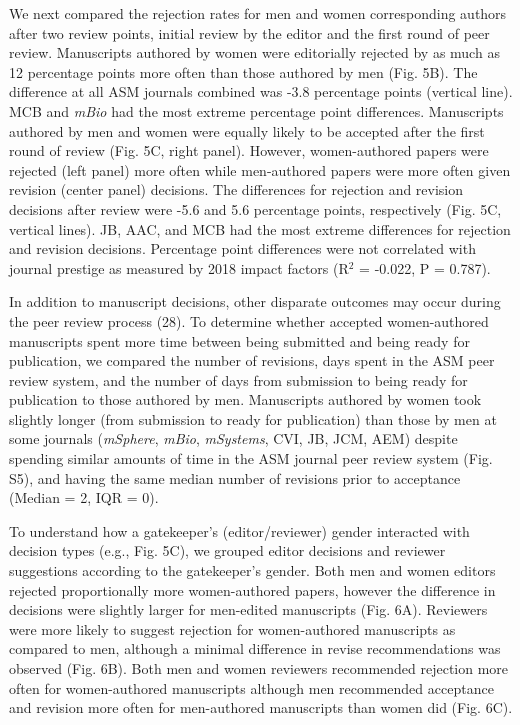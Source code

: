 \documentclass[11pt,]{article}
\begin{document}
We next compared the rejection rates for men and women corresponding
authors after two review points, initial review by the editor and the
first round of peer review. Manuscripts authored by women were
editorially rejected by as much as 12 percentage points more often than
those authored by men (Fig. 5B). The difference at all ASM journals
combined was -3.8 percentage points (vertical line). MCB and \emph{mBio}
had the most extreme percentage point differences. Manuscripts authored
by men and women were equally likely to be accepted after the first
round of review (Fig. 5C, right panel). However, women-authored papers
were rejected (left panel) more often while men-authored papers were
more often given revision (center panel) decisions. The differences for
rejection and revision decisions after review were -5.6 and 5.6
percentage points, respectively (Fig. 5C, vertical lines). JB, AAC, and
MCB had the most extreme differences for rejection and revision
decisions. Percentage point differences were not correlated with journal
prestige as measured by 2018 impact factors (R\({^2}\) = -0.022, P =
0.787).

In addition to manuscript decisions, other disparate outcomes may occur
during the peer review process (28). To determine whether accepted
women-authored manuscripts spent more time between being submitted and
being ready for publication, we compared the number of revisions, days
spent in the ASM peer review system, and the number of days from
submission to being ready for publication to those authored by men.
Manuscripts authored by women took slightly longer (from submission to
ready for publication) than those by men at some journals
(\emph{mSphere}, \emph{mBio}, \emph{mSystems}, CVI, JB, JCM, AEM)
despite spending similar amounts of time in the ASM journal peer review
system (Fig. S5), and having the same median number of revisions prior
to acceptance (Median = 2, IQR = 0).

To understand how a gatekeeper's (editor/reviewer) gender interacted
with decision types (e.g., Fig. 5C), we grouped editor decisions and
reviewer suggestions according to the gatekeeper's gender. Both men and
women editors rejected proportionally more women-authored papers,
however the difference in decisions were slightly larger for men-edited
manuscripts (Fig. 6A). Reviewers were more likely to suggest rejection
for women-authored manuscripts as compared to men, although a minimal
difference in revise recommendations was observed (Fig. 6B). Both men
and women reviewers recommended rejection more often for women-authored
manuscripts although men recommended acceptance and revision more often
for men-authored manuscripts than women did (Fig. 6C).
\end{document}
